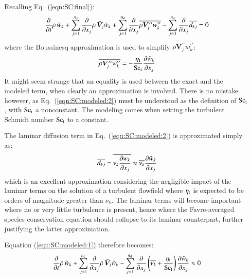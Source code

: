 \documentclass{warpdoc}
\newcommand{\Sct}{{{\rm Sc}_{\rm t}}}
\newcommand{\nd}{{{n}_{\rm d}}}
\newcommand{\turb}{_{\rm t}}
\newcommand{\etat}{{\eta\turb}}
\newcommand{\mfd}{\displaystyle}
\begin{document}
Recalling Eq.\ (\ref{eqn:SC:final}):
%
\begin{equation}
  \mfd\frac{\partial}{\partial t}  \wbar{\rho}\,  {\wtilde{w}_k}
      +  \sum_{j=1}^{\nd} \frac{\partial }{\partial x_j}
        \wbar{\rho}\, {\wtilde{\bm{V}}_j} {\wtilde{w}_k}
      + \sum_{j=1}^{\nd} \frac{\partial }{\partial x_j} 
            \overline{\rho \bm{V}_j^{{\prime\prime}} w_k^{{\prime\prime}}}
      -  \sum_{j=1}^{\nd} \frac{\partial }{\partial x_j}
         \overline{d_{kj}}
      = 0
  \label{eqn:SC:modeled:1}
\end{equation}
%
where the Boussinesq approximation is used to simplify $\overline{\rho \bm{V}_j^{{\prime\prime}} w_k^{{\prime\prime}}}$:
%
\begin{equation}
  \overline{\rho \bm{V}_j^{{\prime\prime}} w_k^{{\prime\prime}}}
    = -\frac{\etat}{\Sct} \frac{\partial {\wtilde{w}_k}}{\partial x_j}
  \label{eqn:SC:modeled:2}
\end{equation}
%
It might seem strange that an equality is used between the exact and
the modeled term, when clearly an approximation is involved. There is
no mistake however, as Eq.\ (\ref{eqn:SC:modeled:2}) must be understood
as the definition of $\Sct$, with $\Sct$ a nonconstant.
The modeling comes when setting the turbulent Schmidt number
$\Sct$ to a constant.

The laminar diffusion term in Eq.\ (\ref{eqn:SC:modeled:2}) is approximated
simply as:
%
\begin{equation}
  \overline{d_{kj}}
 = 
  \overline{\nu_k  \frac{\partial w_k}{\partial x_j}}
 \approx 
  \overline{\nu_k}  \frac{\partial {\tilde{w}_k}}{\partial x_j}
  \label{eqn:dkj:modeled}
\end{equation}
%
which is an excellent approximation considering the negligible
impact of the laminar terms on the solution of a turbulent flowfield
where $\etat$ is expected to be orders of magnitude greater than
$\nu_k$. The laminar terms will become important where no or very
little turbulence is present, hence where the Favre-averaged species
conservation equation should collapse to its laminar counterpart, further
justifying the latter approximation.

Equation (\ref{eqn:SC:modeled:1}) therefore becomes:
%
\begin{equation}
  \mfd\frac{\partial}{\partial t}  \wbar{\rho}\,  {\wtilde{w}_k}
      +  \sum_{j=1}^{\nd} \frac{\partial }{\partial x_j}
        \wbar{\rho}\, {\wtilde{\bm{V}}_j} {\wtilde{w}_k}
      -  \sum_{j=1}^{\nd} \frac{\partial }{\partial x_j}
             \left( \overline{\nu_k} + \frac{\etat}{\Sct} \right)
              \frac{\partial {\wtilde{w}_k}}{\partial x_j}
      \approx 0
  \label{eqn:SC:modeled:final}
\end{equation}
%
\end{document}
